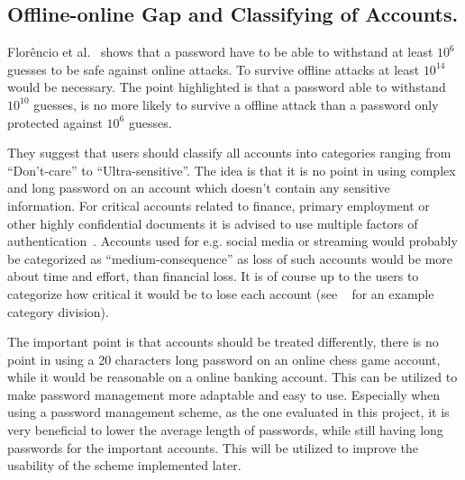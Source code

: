\subsection{Offline-online Gap and Classifying of Accounts.}\label{classification} Florêncio et al.~\cite{guide-pws} shows that a password have to be able to withstand at least $10^6$ guesses to be safe against online attacks. To survive offline attacks at least $10^{14}$ would be necessary. The point highlighted is that a password able to withstand $10^{10}$ guesses, is no more likely to survive a offline attack than a password only protected against $10^6$ guesses. 
\par They suggest that users should classify all accounts into categories ranging from ``Don't-care'' to ``Ultra-sensitive''. The idea is that it is no point in using complex and long password on an account which doesn't contain any sensitive information. For critical accounts related to finance, primary employment or other highly confidential documents it is advised to use multiple factors of authentication~\cite{2-factor-auth}. Accounts used for e.g. social media or streaming would probably be categorized as ``medium-consequence'' as loss of such accounts would be more about time and effort, than financial loss. It is of course up to the users to categorize how critical it would be to lose each account (see ~\cite{guide-pws} for an example category division). 
\par The important point is that accounts should be treated differently, there is no point in using a 20 characters long password on an online chess game account, while it would be reasonable on a online banking account. This can be utilized to make password management more adaptable and easy to use. Especially when using a password management scheme, as the one evaluated in this project, it is very beneficial to lower the average length of passwords, while still having long passwords for the important accounts. This will be utilized to improve the usability of the scheme implemented later.




